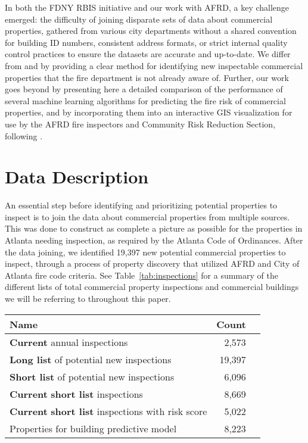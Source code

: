 \documentclass{sig-alternate-05-2015}
\begin{document}
{In both the FDNY RBIS initiative and our work with AFRD, a key challenge emerged: the difficulty of joining disparate sets of data about commercial properties, gathered from various city departments without a shared convention for building ID numbers, consistent address formats, or strict internal quality control practices to ensure the datasets are accurate and up-to-date. We differ from \cite{copeland15} and \cite{garis14} by providing a clear method for identifying new inspectable commercial properties that the fire department is not already aware of. Further, our work goes beyond \cite{copeland15} by presenting here a detailed comparison of the performance of several machine learning algorithms for predicting the fire risk of commercial properties, and by incorporating them into an interactive GIS visualization for use by the AFRD fire inspectors and Community Risk Reduction Section, following \cite{dobrica12}. 

\section{Data Description}
An essential step before identifying and prioritizing potential properties to inspect is to join the data about commercial properties from multiple sources. This was done to construct as complete a picture as possible for the properties in Atlanta needing inspection, as required by the Atlanta Code of Ordinances. 
After the data joining, we identified 19,397 new potential commercial properties to inspect, through a process of property discovery that utilized AFRD and City of Atlanta fire code criteria. See Table~\ref{tab:inspections} for a summary of the different lists of total commercial property inspections and commercial buildings we will be referring to throughout this paper.


\begin{table}[!h]
\sffamily
  \centering

    \begin{tabular}{lll}
    \toprule
    \textbf{Name} & \textbf{Count} \\
    \midrule
    \multicolumn{1}{l}{\textbf{Current} annual inspections} & \multicolumn{1}{r}{2,573}\\
\multicolumn{1}{l}{\textbf{Long list} of potential new inspections\protect\footnotemark} &
    \multicolumn{1}{r}{19,397}\\
\multicolumn{1}{l}{\textbf{Short list} of potential new inspections} & \multicolumn{1}{r}{6,096}\\
\multicolumn{1}{l}{\textbf{Current}  \textbf{short list} inspections} & \multicolumn{1}{r}{8,669}\\
\multicolumn{1}{l}{\textbf{Current}  \textbf{short list} inspections with risk score} & \multicolumn{1}{r}{5,022}\\
\multicolumn{1}{l}{Properties for building predictive model} & \multicolumn{1}{r}{8,223}\\
    \bottomrule
    \end{tabular}


\end{table}}
\end{document}
